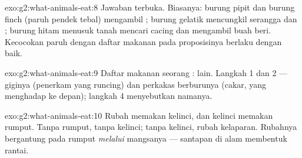\begin{solution}{exo:g2:what-animals-eat:8}
Jawaban terbuka. Biasanya: burung pipit dan burung finch (paruh pendek
tebal) mengambil ; burung gelatik mencungkil serangga dan ;
burung hitam menusuk tanah mencari cacing dan mengambil buah beri.
Kecocokan paruh dengan daftar makanan pada proposisinya berlaku dengan
baik.
\end{solution}

\begin{solution}{exo:g2:what-animals-eat:9}
Daftar makanan seorang :  lain. Langkah 1 dan 2 ---
giginya (penerkam yang runcing) dan perkakas berburunya (cakar, 
yang menghadap ke depan); langkah 4 menyebutkan namanya.
\end{solution}

\begin{solution}{exo:g2:what-animals-eat:10}
Rubah memakan kelinci, dan kelinci memakan rumput. Tanpa rumput, tanpa
kelinci; tanpa kelinci, rubah kelaparan. Rubahnya bergantung pada
rumput \emph{melalui} mangsanya --- santapan di alam membentuk rantai.
\end{solution}
